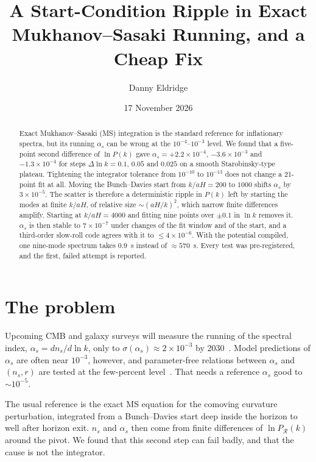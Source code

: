 \documentclass[aps,prd,twocolumn,superscriptaddress,nofootinbib,showkeys]{revtex4-2}
\begin{document}
\title{A Start-Condition Ripple in Exact Mukhanov--Sasaki Running, and a Cheap Fix}
\author{Danny Eldridge}
\date{17 November 2026}
\begin{abstract}
Exact Mukhanov--Sasaki (MS) integration is the standard reference for inflationary spectra, but its running $\alpha_s$ can be wrong at the $10^{-4}$--$10^{-3}$ level. We found that a five-point second difference of $\ln P(k)$ gave $\alpha_s=+2.2\times10^{-4}$, $-3.6\times10^{-3}$ and $-1.3\times10^{-4}$ for steps $\Delta\ln k=0.1$, $0.05$ and $0.025$ on a smooth Starobinsky-type plateau. Tightening the integrator tolerance from $10^{-10}$ to $10^{-13}$ does not change a 21-point fit at all. Moving the Bunch--Davies start from $k/aH=200$ to $1000$ shifts $\alpha_s$ by $3\times10^{-5}$. The scatter is therefore a deterministic ripple in $P(k)$ left by starting the modes at finite $k/aH$, of relative size $\sim(aH/k)^2$, which narrow finite differences amplify. Starting at $k/aH=4000$ and fitting nine points over $\pm0.1$ in $\ln k$ removes it. $\alpha_s$ is then stable to $7\times10^{-7}$ under changes of the fit window and of the start, and a third-order slow-roll code agrees with it to $\le4\times10^{-6}$. With the potential compiled, one nine-mode spectrum takes $0.9$~s instead of $\approx570$~s. Every test was pre-registered, and the first, failed attempt is reported.
\end{abstract}
\maketitle

\section{The problem}
Upcoming CMB and galaxy surveys will measure the running of the spectral index, $\alpha_s=d n_s/d\ln k$, only to $\sigma(\alpha_s)\approx2\times10^{-3}$ by 2030~\cite{Prospects}. Model predictions of $\alpha_s$ are often near $10^{-3}$, however, and parameter-free relations between $\alpha_s$ and $(n_s,r)$ are tested at the few-percent level~\cite{P1}. That needs a reference $\alpha_s$ good to $\sim10^{-5}$.

The usual reference is the exact MS equation for the comoving curvature perturbation, integrated from a Bunch--Davies start deep inside the horizon to well after horizon exit. $n_s$ and $\alpha_s$ then come from finite differences of $\ln P_{\mathcal R}(k)$ around the pivot. We found that this second step can fail badly, and that the cause is not the integrator.
\end{document}
